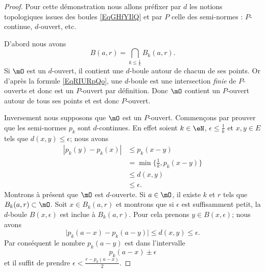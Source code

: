 \begin{proof}
    Pour cette démonstration nous allons préfixer par \( d\) les notions topologiques issues des boules \eqref{EqGHfYIlQ} et par \( P\) celle des semi-normes : \( P\)-continue, \( d\)-ouvert, etc.

    D'abord nous avons
    \begin{equation}    \label{EqRIURpQo}
        B(a,r)=\bigcap_{k\leq \frac{1}{ k }}B_k(a,r).
    \end{equation}
    Si \( \mO\) est un \( d\)-ouvert, il contient une \( d\)-boule autour de chacun de ses points. Or d'après la formule \eqref{EqRIURpQo}, une \( d\)-boule est une intersection \emph{finie} de \( P\)-ouverts et donc est un \( P\)-ouvert par définition. Donc \( \mO\) contient un \( P\)-ouvert autour de tous ses points et est donc \( P\)-ouvert.

    Inversement nous supposons que \( \mO\) est un \( P\)-ouvert. Commençons par prouver que les semi-normes \( p_k\) sont \( d\)-continues. En effet soient \( k\in \eN\), \( \epsilon\leq \frac{1}{ k }\) et \( x,y\in E\) tels que \( d(x,y)\leq \epsilon\); nous avons
    \begin{subequations}
        \begin{align}
            | p_k(y)-p_k(x) |&\leq p_k(x-y)\\
            &=\min\{ \frac{1}{ k },p_k(x-y) \}\\
            &\leq d(x,y)\\
            &\leq \epsilon.
        \end{align}
    \end{subequations}
    Montrons à présent que \( \mO\) est \( d\)-ouverte. Si \( a\in\mO\), il existe \( k\) et \( r\) tels que \( B_k(a,r)\subset\mO\). Soit \( x\in B_k(a,r)\) et montrons que si \( \epsilon\) est suffisamment petit, la \( d\)-boule \( B(x,\epsilon)\) est inclue à \( B_k(a,r)\). Pour cela prenons \( y\in B(x,\epsilon)\); nous avons
    \begin{equation}
        \big| p_k(a-x)-p_k(a-y) \big|\leq d(x,y)\leq \epsilon.
    \end{equation}
    Par conséquent le nombre \( p_k(a-y)\) est dans l'intervalle
    \begin{equation}
        p_k(a-x)\pm\epsilon
    \end{equation}
    et il suffit de prendre \( \epsilon<\frac{ r-p_k(a-x) }{2}\).
\end{proof}

